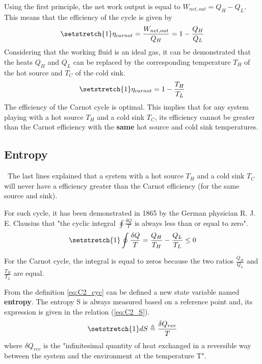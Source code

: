 Using the first principle, the net work output is equal to $W_{net,out}=Q_H-Q_L$. This means that the efficiency of the cycle is given by
\begin{equation}
\setstretch{1}
\eta_{carnot} = \frac{W_{net,out}}{Q_H} = 1 - \frac{Q_H}{Q_L}
\end{equation} 
Considering that the working fluid is an ideal gas, it can be demonstrated that the heats $Q_H$ and $Q_L$ can be replaced by the corresponding temperature $T_H$ of the hot source and $T_C$ of the cold sink.
\begin{equation}
\setstretch{1}
\eta_{carnot}=1-\frac{T_H}{T_L}\label{eq:C2_eff_carnot}
\end{equation} 
The efficiency of the Carnot cycle is optimal. This implies that for any system playing with a hot source $T_H$ and a cold sink $T_C$, its efficiency cannot be greater than the Carnot efficiency with the \textbf{same} hot source and cold sink temperatures.
\subsection{Entropy}
\quad\, The last lines explained that a system with a hot source $T_H$ and a cold sink $T_C$ will never have a efficiency greater than the Carnot efficiency (for the same source and sink).

For such cycle, it has been demonstrated in 1865 by the German physician R. J. E. Clausius that "the cyclic integral $\oint\frac{\delta Q}{T}$ is always less than or equal to zero"\cite{2015}.
\begin{equation}
\setstretch{1}
\oint\frac{\delta Q}{T} = \frac{Q_H}{T_H} - \frac{Q_L}{T_L}\leq 0\label{eq:C2_cyc}
\end{equation}

For the Carnot cycle, the integral is equal to zeros because the two ratios $\frac{Q_H}{Q_L}$ and $\frac{T_H}{T_L}$ are equal.

From the definition \ref{eq:C2_cyc} can be defined a new state variable named \textbf{entropy}. The entropy S is always measured based on a reference point and, its expression is given in the relation (\ref{eq:C2_S}).
\begin{equation}
\setstretch{1}
dS \triangleq \frac{\delta Q_{rev}}{T}\label{eq:C2_S}
\end{equation}
where $\delta Q_{rev}$ is the "infinitesimal quantity of heat exchanged in a reversible way between the system and the environment at the temperature T"\cite{Dewallef2019}. 

